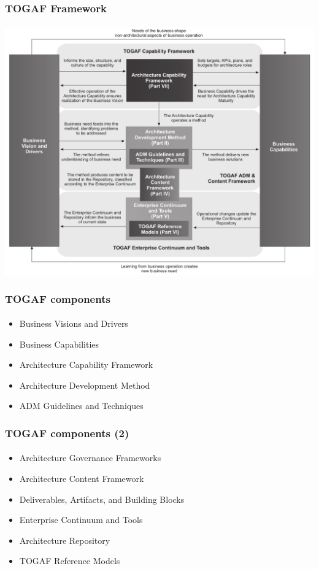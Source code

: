 \documentclass[aspectratio=169, table]{beamer}
\begin{document}
    {
        \begin{frame}
            \frametitle{TOGAF Framework}
            \framesubtitle{\hspace{1cm}}
            \begin{center}
                \includegraphics[width=.78\textwidth]{../figures/togaf}
            \end{center}
        \end{frame}
    }

    \begin{frame}
        \frametitle{TOGAF components}
        \framesubtitle{\hspace{1cm}}
        \begin{itemize}
            \item Business Visions and Drivers
            \item Business Capabilities
            \item Architecture Capability Framework
            \item Architecture Development Method
            \item ADM Guidelines and Techniques
        \end{itemize}
    \end{frame}

    \begin{frame}
        \frametitle{TOGAF components (2)}
        \framesubtitle{\hspace{1cm}}
        \begin{itemize}

            \item Architecture Governance Frameworks
            \item Architecture Content Framework
            \item Deliverables, Artifacts, and Building Blocks
            \item Enterprise Continuum and Tools
            \item Architecture Repository
            \item TOGAF Reference Models
        \end{itemize}
    \end{frame}
\end{document}
